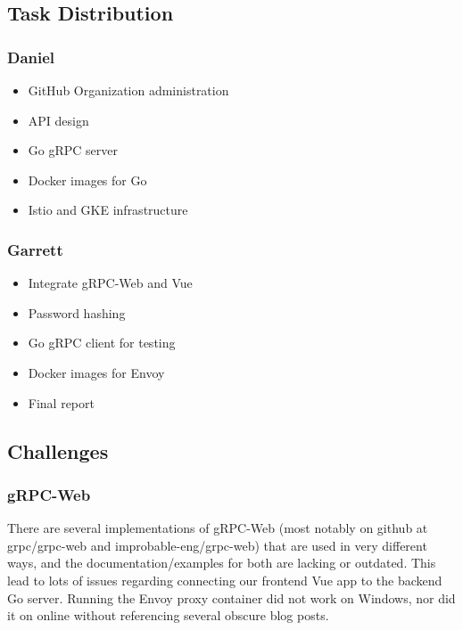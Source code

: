     \subsection{Task Distribution}
        \subsubsection{Daniel}
        \begin{itemize}
            \item GitHub Organization administration
            \item API design
            \item Go gRPC server
            \item Docker images for Go
            \item Istio and GKE infrastructure
        \end{itemize}

        \subsubsection{Garrett}
        \begin{itemize}
            \item Integrate gRPC-Web and Vue
            \item Password hashing
            \item Go gRPC client for testing
            \item Docker images for Envoy
            \item Final report
        \end{itemize}

    \subsection{Challenges}
        \subsubsection{gRPC-Web}
            There are several implementations of gRPC-Web (most notably on github at grpc/grpc-web and improbable-eng/grpc-web) that are used in very different ways, and the documentation/examples for both are lacking or outdated. This lead to lots of issues regarding connecting our frontend Vue app to the backend Go server. Running the Envoy proxy container did not work on Windows, nor did it on online without referencing several obscure blog posts.
            
